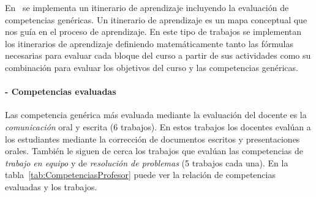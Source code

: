 En~\cite{yang2014fine} se implementa un itinerario de aprendizaje incluyendo la evaluación de competencias genéricas. Un itinerario de aprendizaje es un mapa conceptual que nos guía en el proceso de aprendizaje. En este tipo de trabajos se implementan los itinerarios de aprendizaje definiendo matemáticamente tanto las fórmulas necesarias para evaluar cada bloque del curso a partir de sus actividades como su combinación para evaluar los objetivos del curso y las competencias genéricas.

\paragraph*{- Competencias evaluadas}
Las competencia genérica más evaluada mediante la evaluación del docente es la \emph{comunicación} oral y escrita (6 trabajos). En estos trabajos los docentes evalúan a los estudiantes mediante la corrección de documentos escritos y presentaciones orales. También le siguen de cerca los trabajos que evalúan las competencias de \emph{trabajo en equipo} y de \emph{resolución de problemas} (5 trabajos cada una). En la tabla~\ref{tab:CompetenciasProfesor} puede ver la relación de competencias evaluadas y los trabajos.

